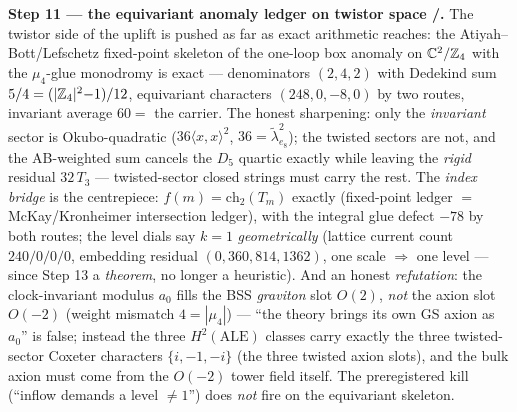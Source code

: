 \par\smallskip\noindent\textbf{Step 11 --- the equivariant anomaly ledger on twistor space
\mE/\mC.} The twistor side of the uplift is pushed as far as exact arithmetic reaches: the
Atiyah--Bott/Lefschetz fixed-point skeleton of the one-loop box anomaly on $\mathbb C^2/\mathbb{Z}_4$ with
the $\mu_4$-glue monodromy is exact --- denominators $(2,4,2)$ with Dedekind sum
$5/4=(|\mathbb{Z}_4|^2{-}1)/12$, equivariant characters $(248,0,-8,0)$ by two routes, invariant average
$60=$ the carrier. The honest sharpening: only the \emph{invariant} sector is Okubo-quadratic
($36\langle x,x\rangle^2$, $36=\tilde\lambda^2_{e_8}$); the twisted sectors are not, and the
AB-weighted sum cancels the $D_5$ quartic exactly while leaving the \emph{rigid} residual
$32\,T_3$ --- twisted-sector closed strings must carry the rest. The \emph{index bridge} is the
centrepiece: $f(m)=\mathrm{ch}_2(T_m)$ exactly (fixed-point ledger $=$ McKay/Kronheimer
intersection ledger), with the integral glue defect $-78$ by both routes; the level dials say
$k=1$ \emph{geometrically} (lattice current count $240/0/0/0$, embedding residual
$(0,360,814,1362)$, one scale $\Rightarrow$ one level --- since Step 13 a \emph{theorem}, no
longer a heuristic). And an honest \emph{refutation}: the
clock-invariant modulus $a_0$ fills the BSS \emph{graviton} slot $O(2)$, \emph{not} the axion slot
$O(-2)$ (weight mismatch $4=|\mu_4|$) --- ``the theory brings its own GS axion as $a_0$'' is
false; instead the three $H^2(\mathrm{ALE})$ classes carry exactly the three twisted-sector
Coxeter characters $\{i,-1,-i\}$ (the three twisted axion slots), and the bulk axion must come
from the $O(-2)$ tower field itself. The preregistered kill (``inflow demands a level $\neq1$'')
does \emph{not} fire on the equivariant skeleton.

